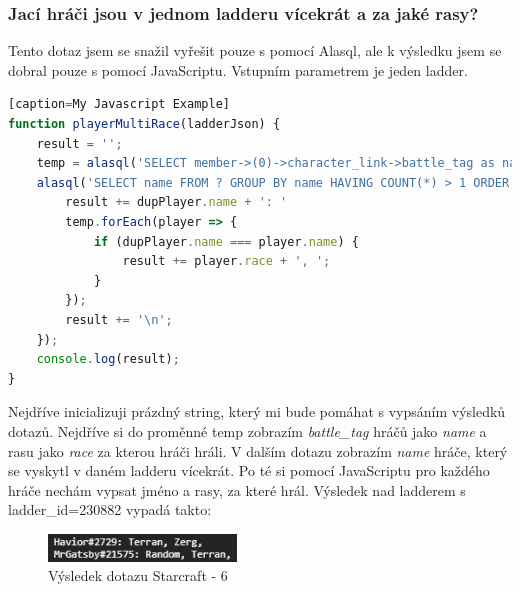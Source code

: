 \documentclass[a4, titlepage]{article}
\begin{document}
\subsubsection{Jací hráči jsou v jednom ladderu vícekrát a za jaké rasy?}
Tento dotaz jsem se snažil vyřešit pouze s pomocí Alasql, ale k výsledku jsem se dobral pouze s pomocí JavaScriptu. Vstupním parametrem je jeden ladder.
\begin{lstlisting}[language=JavaScript][caption=My Javascript Example]
function playerMultiRace(ladderJson) {
    result = '';
    temp = alasql('SELECT member->(0)->character_link->battle_tag as name, member->(0)->played_race_count->(0)->race as race FROM ?', [ladderJson.team]);
    alasql('SELECT name FROM ? GROUP BY name HAVING COUNT(*) > 1 ORDER BY name', [temp]).forEach(dupPlayer => {
        result += dupPlayer.name + ': '
        temp.forEach(player => {
            if (dupPlayer.name === player.name) {
                result += player.race + ', ';
            }
        });
        result += '\n';
    });
    console.log(result);
}
\end{lstlisting}
Nejdříve inicializuji prázdný string, který mi bude pomáhat s vypsáním výsledků dotazů. Nejdříve si do proměnné temp zobrazím \textit{battle\_tag} hráčů jako \textit{name} a rasu jako \textit{race} za kterou hráči hráli. V dalším dotazu zobrazím \textit{name} hráče, který se vyskytl v daném ladderu vícekrát. Po té si pomocí JavaScriptu pro každého hráče nechám vypsat jméno a rasy, za které hrál. Výsledek nad ladderem s ladder\_id=230882 vypadá takto:
\begin{figure}[h]
    \centering
    \includegraphics[width=5cm]{S6}
    \caption{Výsledek dotazu Starcraft - 6}
\end{figure} 
\newpage
\end{document}
